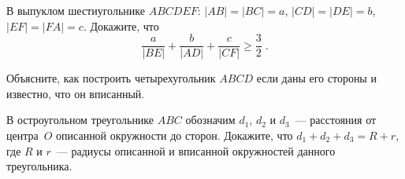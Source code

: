 \begin{problems}
\item
В выпуклом шестиугольнике $ABCDEF$:
$\lvert AB \rvert = \lvert BC \rvert = a$,
$\lvert CD \rvert = \lvert DE \rvert = b$,
$\lvert EF \rvert = \lvert FA \rvert = c$.
Докажите, что
\[
    \frac{a}{\lvert BE \rvert} +
    \frac{b}{\lvert AD \rvert} +
    \frac{c}{\lvert CF \rvert}
\geq
    \frac{3}{2}
\; . \]

\item
Объясните, как построить четырехугольник $ABCD$ если даны его стороны
и известно, что он вписанный.

\item
В остроугольном треугольнике $ABC$ обозначим $d_1$, $d_2$ и $d_3$~—
расстояния от центра~$O$ описанной окружности до сторон.
Докажите, что $d_1 + d_2 + d_3 = R + r$, где $R$ и $r$~— радиусы описанной
и вписанной окружностей данного треугольника.

\end{problems}

